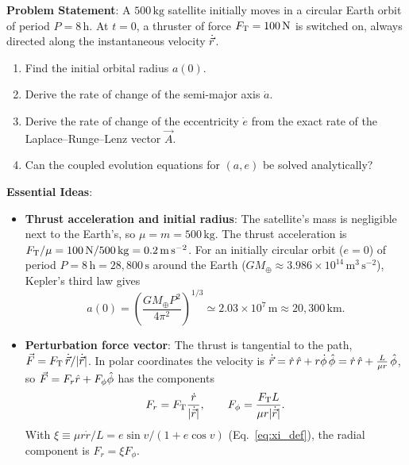 \textbf{Problem Statement}: A $500\,\mathrm{kg}$ satellite initially moves in a circular Earth orbit of period $P = 8\,\mathrm{h}$. At $t=0$, a thruster of force $F_{\rm T}=100\,\mathrm N$ is switched on, always directed along the instantaneous velocity $\dot{\vec r}$.
\begin{enumerate}[label=(\alph*)]
	\item Find the initial orbital radius $a(0)$.
	\item Derive the rate of change of the semi-major axis $\dot a$.
	\item Derive the rate of change of the eccentricity $\dot e$ from the exact rate of the Laplace--Runge--Lenz vector $\vec A$.
	\item Can the coupled evolution equations for $(a, e)$ be solved analytically?
\end{enumerate}

\textbf{Essential Ideas}:
\begin{itemize}
	\item \textbf{Thrust acceleration and initial radius}: The satellite's mass is negligible next to the Earth's, so $\mu=m=500\,\mathrm{kg}$. The thrust acceleration is $F_{\rm T}/\mu = 100\,\mathrm{N}/500\,\mathrm{kg} = 0.2\,\mathrm{m\,s^{-2}}$. For an initially circular orbit ($e=0$) of period $P = 8\,\mathrm{h} = 28{,}800\,\mathrm{s}$ around the Earth ($GM_\oplus \approx 3.986 \times 10^{14}\,\mathrm{m^3\,s^{-2}}$), Kepler's third law gives
	\[
	a(0) = \left(\frac{GM_\oplus P^2}{4\pi^2}\right)^{1/3} \simeq 2.03 \times 10^7\,\mathrm{m} \approx 20{,}300\,\mathrm{km}.
	\]
	\item \textbf{Perturbation force vector}: The thrust is tangential to the path, $\vec F = F_{\rm T}\,\dot{\vec r}/|\dot{\vec r}|$. In polar coordinates the velocity is $\dot{\vec r} = \dot r\,\hat r + r\dot\phi\,\hat\phi = \dot r\,\hat r + \frac{L}{\mu r}\,\hat\phi$, so $\vec F = F_r\hat r + F_\phi\hat\phi$ has the components
	\[
	F_r = F_{\rm T}\frac{\dot r}{|\dot{\vec r}|}, \qquad F_\phi = \frac{F_{\rm T}L}{\mu r|\dot{\vec r}|}.
	\]
	With $\xi \equiv \mu r\dot r/L = e\sin v/(1+e\cos v)$ (Eq.~\eqref{eq:xi_def}), the radial component is $F_r = \xi F_\phi$.
\end{itemize}

